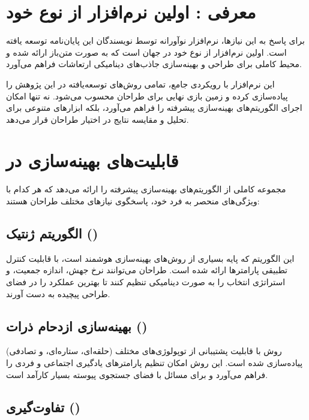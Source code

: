 \section{معرفی : اولین نرم‌افزار از نوع خود}

برای پاسخ به این نیازها، نرم‌افزار نوآورانه  توسط نویسندگان این پایان‌نامه توسعه یافته است.  اولین نرم‌افزار از نوع خود در جهان است که به صورت متن‌باز ارائه شده و محیط کاملی برای طراحی و بهینه‌سازی جاذب‌های دینامیکی ارتعاشات فراهم می‌آورد.

این نرم‌افزار با رویکردی جامع، تمامی روش‌های توسعه‌یافته در این پژوهش را پیاده‌سازی کرده و زمین بازی نهایی برای طراحان محسوب می‌شود.  نه تنها امکان اجرای الگوریتم‌های بهینه‌سازی پیشرفته را فراهم می‌آورد، بلکه ابزارهای متنوعی برای تحلیل و مقایسه نتایج در اختیار طراحان قرار می‌دهد.

\section{قابلیت‌های بهینه‌سازی در }

 مجموعه کاملی از الگوریتم‌های بهینه‌سازی پیشرفته را ارائه می‌دهد که هر کدام با ویژگی‌های منحصر به فرد خود، پاسخگوی نیازهای مختلف طراحان هستند:

\subsection{الگوریتم ژنتیک ()}

این الگوریتم که پایه بسیاری از روش‌های بهینه‌سازی هوشمند است، با قابلیت کنترل تطبیقی پارامترها ارائه شده است. طراحان می‌توانند نرخ جهش، اندازه جمعیت، و استراتژی انتخاب را به صورت دینامیکی تنظیم کنند تا بهترین عملکرد را در فضای طراحی پیچیده به دست آورند.

\subsection{بهینه‌سازی ازدحام ذرات ()}

روش  با قابلیت پشتیبانی از توپولوژی‌های مختلف (حلقه‌ای، ستاره‌ای، و تصادفی) پیاده‌سازی شده است. این روش امکان تنظیم پارامترهای یادگیری اجتماعی و فردی را فراهم می‌آورد و برای مسائل با فضای جستجوی پیوسته بسیار کارآمد است.

\subsection{تفاوت‌گیری ()}

